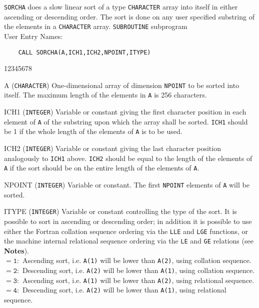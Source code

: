               
          
\Submitter{}                     
{\tt SORCHA} does a slow linear sort of a type {\tt CHARACTER} array
into itself in
either ascending or descending order. The sort is done on any user
specified substring of the elements in a {\tt CHARACTER} array.
\Structure
{\tt SUBROUTINE} subprogram \\
User Entry Names: 
\Usage
\begin{verbatim}
    CALL SORCHA(A,ICH1,ICH2,NPOINT,ITYPE)
\end{verbatim}
\begin{DLtt}{12345678}
\item [A] ({\tt CHARACTER}) One-dimensional array of dimension
{\tt NPOINT} to be sorted into itself. The maximum length of the
elements in {\tt A} is 256 characters.
\item [ICH1] ({\tt INTEGER}) Variable or constant giving the first
character position in each element of {\tt A} of the substring upon which
the array shall be sorted. {\tt ICH1} should be 1 if the whole length of
the elements of {\tt A} is to be used.
\item [ICH2] ({\tt INTEGER}) Variable or constant giving the last
character position analogously to {\tt ICH1} above. {\tt ICH2} should
be equal to the length of the elements of {\tt A} if the sort should be
on the entire length of the elements of {\tt A}.
\item [NPOINT]({\tt INTEGER}) Variable or constant. The first
{\tt NPOINT} elements of {\tt A} will be sorted.
\item [ITYPE] ({\tt INTEGER}) Variable or constant controlling the type
of the sort. It is possible to sort in ascending or descending order;
in addition it is possible to use either the Fortran collation
sequence ordering via the {\tt LLE} and {\tt LGE} functions, or the
machine internal relational sequence ordering via the {\tt LE} and
{\tt GE} relations (see {\bf Notes}). \\
$\mathtt{= 1:}$ Ascending sort, i.e. {\tt A(1)} will be lower than
{\tt A(2)}, using collation sequence. \\
$\mathtt{= 2:}$ Descending sort, i.e. {\tt A(2)} will be lower than
{\tt A(1)}, using collation sequence. \\
$\mathtt{= 3:}$ Ascending sort, i.e. {\tt A(1)} will be lower than
{\tt A(2)}, using relational sequence. \\
$\mathtt{= 4:}$ Descending sort, i.e. {\tt A(2)} will be lower than
{\tt A(1)}, using relational sequence.
\end{DLtt}
